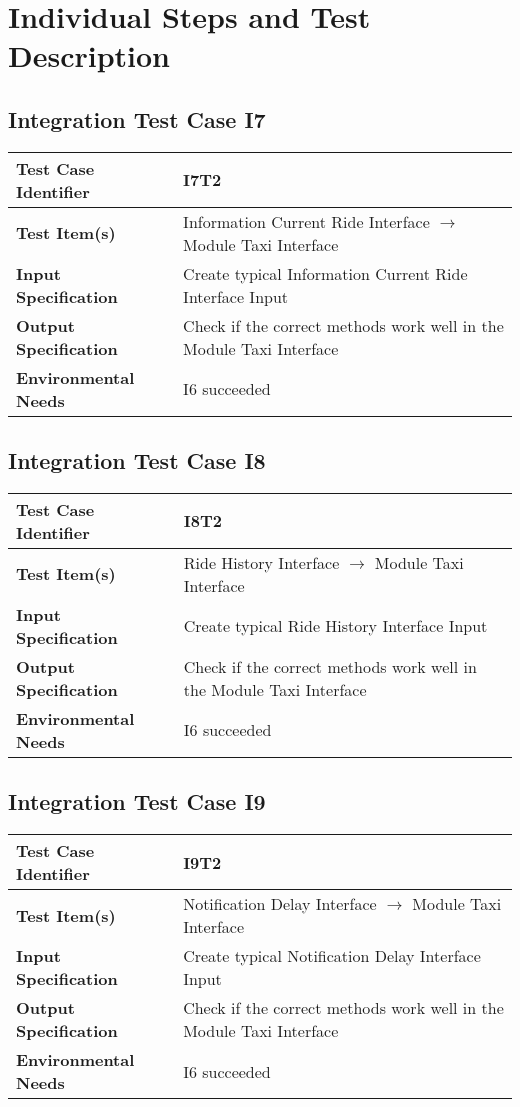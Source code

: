 \section{Individual Steps and Test Description}
\subsection{Integration Test Case I7}
\begin{tabular}{l p{9cm}}
	\hline
	\textbf{Test	Case Identifier} & I7T2 \\ \hline
	\textbf{Test	Item(s)} & Information Current Ride Interface $\rightarrow$ Module Taxi Interface \\ \hline
	\textbf{Input Specification} & Create typical Information Current Ride Interface Input\\ \hline
	\textbf{Output Specification} & Check if the correct methods work well in the Module Taxi Interface \\ \hline
	\textbf{Environmental Needs} & I6 succeeded \\ \hline
\end{tabular}
\subsection{Integration Test Case I8}
\begin{tabular}{l p{9cm}}
	\hline
	\textbf{Test	Case Identifier} & I8T2 \\ \hline
	\textbf{Test	Item(s)} & Ride History Interface $\rightarrow$ Module Taxi Interface \\ \hline
	\textbf{Input Specification} & Create typical Ride History Interface Input\\ \hline
	\textbf{Output Specification} & Check if the correct methods work well in the Module Taxi Interface \\ \hline
	\textbf{Environmental Needs} & I6 succeeded \\ \hline
\end{tabular}
\subsection{Integration Test Case I9}
\begin{tabular}{l p{9cm}}
	\hline
	\textbf{Test	Case Identifier} & I9T2 \\ \hline
	\textbf{Test	Item(s)} & Notification Delay Interface $\rightarrow$ Module Taxi Interface \\ \hline
	\textbf{Input Specification} & Create typical Notification Delay Interface Input\\ \hline
	\textbf{Output Specification} & Check if the correct methods work well in the Module Taxi Interface \\ \hline
	\textbf{Environmental Needs} & I6 succeeded \\ \hline
\end{tabular}
